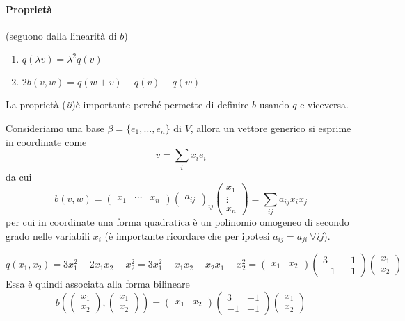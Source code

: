 \documentclass{article}     %
\begin{document}
\paragraph*{Proprietà} (seguono dalla linearità di $b$)
\begin{enumerate}[label={\it\roman*})]
    \item $q(\lambda v)=\lambda^2q(v)$
    \item $2b(v,w)=q(w+v)-q(v)-q(w)$
\end{enumerate}
La proprietà (\textit{ii})è importante perché permette di definire $b$ usando $q$ e viceversa.

\begin{oss}
    Consideriamo una base $\beta=\{e_1,\dots, e_n\}$ di $V$, allora un vettore generico si esprime in coordinate come 
    \[v=\sum_ix_ie_i\]
    da cui 
    \[b(v,w)= \begin{pmatrix}
        x_1&\cdots&x_n
    \end{pmatrix} \begin{pmatrix}
        a_{ij}
    \end{pmatrix}_{ij}\begin{pmatrix}
        x_1\\\vdots\\x_n
    \end{pmatrix}=\sum_{ij}a_{ij}x_ix_j\]
    per cui in coordinate una forma quadratica è un polinomio omogeneo di secondo grado nelle variabili $x_i$ (è importante ricordare che per ipotesi $a_{ij}=a_{ji}\ \forall ij$).
\end{oss}

\begin{ex}
    \[q(x_1,x_2)=3x_1^2-2x_1x_2-x_2^2=3x_1^2-x_1x_2-x_2x_1-x_2^2= \begin{pmatrix}
        x_1&x_2
    \end{pmatrix} \begin{pmatrix}
        3&-1\\-1&-1
    \end{pmatrix} \begin{pmatrix}
        x_1\\x_2
    \end{pmatrix} \]
    Essa è quindi associata alla forma bilineare 
    \[b\left( \begin{pmatrix}
        x_1\\x_2
    \end{pmatrix},\begin{pmatrix}
        x_1\\x_2
    \end{pmatrix}\right) = \begin{pmatrix}
        x_1&x_2
    \end{pmatrix} \begin{pmatrix}
        3&-1\\-1&-1
    \end{pmatrix} \begin{pmatrix}
        x_1\\x_2
    \end{pmatrix} \]
\end{ex}
\end{document}
